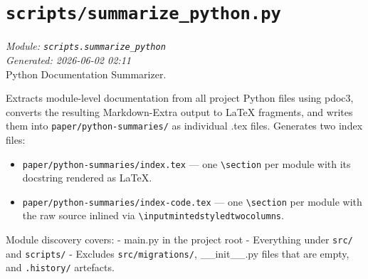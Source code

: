 
\section{\texttt{scripts/summarize\_python.py}}
\textit{Module: \texttt{scripts.summarize\_python}} \\
\textit{Generated: 2026-06-02 02:11} \\

Python Documentation Summarizer.

Extracts module-level documentation from all project Python files using
pdoc3, converts the resulting Markdown-Extra output to LaTeX fragments,
and writes them into \texttt{paper/python-summaries/} as individual .tex
files. Generates two index files:

\begin{itemize}
    \tightlist
  \item
    \texttt{paper/python-summaries/index.tex} --- one
    \texttt{\textbackslash{}section} per module with its docstring
    rendered as LaTeX.
  \item
    \texttt{paper/python-summaries/index-code.tex} --- one
    \texttt{\textbackslash{}section} per module with the raw source
    inlined via \texttt{\textbackslash{}inputmintedstyledtwocolumns}.
\end{itemize}

Module discovery covers: - main.py in the project root - Everything
under \texttt{src/} and \texttt{scripts/} - Excludes
\texttt{src/migrations/}, \_\_init\_\_.py files that are empty, and
\texttt{.history/} artefacts.
